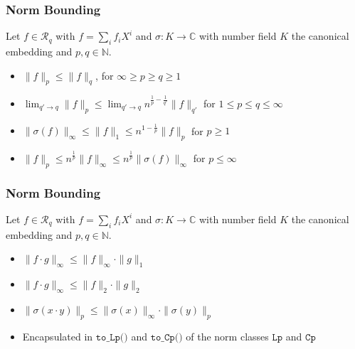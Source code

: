 \documentclass[t, aspectratio=169]{beamer}
\begin{document}
\begin{frame}
    \frametitle{Norm Bounding}
    Let $f \in \mathcal{R}_q$  with $f = \sum_i f_i X^i$ and $\sigma : K \rightarrow \mathbb{C}$ with number field $K$ the canonical embedding and $p, q \in \mathbb{N}$.\pause
    \begin{itemize}[<+->]
        \item $\| f \|_p \leq \| f \|_q$, for $\infty \geq p \geq q \geq 1$
        \item $\lim_{q' \rightarrow q}\| f \|_p \leq \lim_{q' \rightarrow q} n^{\frac{1}{p} - \frac{1}{q'}}\| f \|_{q'}$ for $1 \leq p \leq q \leq \infty$
        \item $\| \sigma(f) \|_\infty\leq \| f \|_1 \leq n^{1 - \frac{1}{p}} \| f \|_p $ for $p \geq 1$
        \item $\| f \|_p             \leq  n^{\frac{1}{p}} \| f \|_\infty \leq n^{\frac{1}{p}} \| \sigma(f) \|_\infty$ for  $p \leq \infty$
    \end{itemize}
\end{frame}
\begin{frame}
    \frametitle{Norm Bounding}
    Let $f \in \mathcal{R}_q$  with $f = \sum_i f_i X^i$ and $\sigma : K \rightarrow \mathbb{C}$ with number field $K$ the canonical embedding and $p, q \in \mathbb{N}$.\pause
    \begin{itemize}[<+->]
        \item $\|f \cdot g\|_\infty \leq \|f\|_\infty \cdot \|g\|_1$
        \item $\|f \cdot g\|_\infty \leq \|f\|_2 \cdot \|g\|_2$
        \item $\| \sigma(x \cdot y) \|_p \leq  \| \sigma(x) \|_\infty \cdot \| \sigma(y) \|_p$
        \item Encapsulated in $\texttt{to\_Lp()}$ and $\texttt{to\_Cp()}$ of the norm classes $\texttt{Lp}$ and $\texttt{Cp}$
    \end{itemize}
\end{frame}
\end{document}
